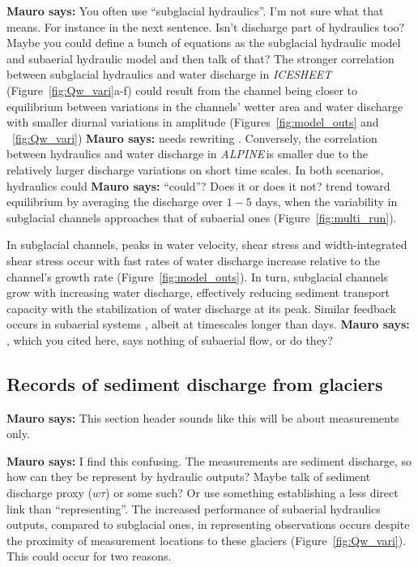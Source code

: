 \documentclass[draft]{agujournal2019}
\newcommand{\mauro}[1]{{\textbf{\color{green}Mauro says:} \color{green} #1} }
\newcommand{\alpine}{\textit{ALPINE}\,}
\newcommand{\icesheet}{\textit{ICESHEET}\,}
\begin{document}
\mauro{You often use ``subglacial hydraulics''.  I'm not sure what that means. For instance in the next sentence.  Isn't discharge part of hydraulics too?  Maybe you could define a bunch of equations as the subglacial hydraulic model and subaerial hydraulic model and then talk of that?}
%
The stronger correlation between subglacial hydraulics and water discharge in \icesheet{} (Figure~\ref{fig:Qw_vari}a-f) could result from the channel being closer to equilibrium between variations in the channels' wetter area and water discharge with smaller diurnal variations in amplitude (Figures~\ref{fig:model_outs} and ~\ref{fig:Qw_vari}) \mauro{needs rewriting}.
Conversely, the correlation between hydraulics and water discharge in \alpine is smaller due to the relatively larger discharge variations on short time scales.
In both scenarios, hydraulics could \mauro{``could''?  Does it or does it not?} trend toward equilibrium by averaging the discharge over $1-5$ days, when the variability in subglacial channels approaches that of subaerial ones (Figure~\ref{fig:multi_run}).

In subglacial channels, peaks in water velocity, shear stress and width-integrated shear stress occur with  fast rates of water discharge increase relative to the channel's growth rate (Figure~\ref{fig:model_outs}).
In turn, subglacial channels grow with increasing water discharge, effectively reducing sediment transport capacity with the stabilization of water discharge at its peak.
Similar feedback occurs in subaerial systems \cite{phillips2016}, albeit at timescales longer than days.  \mauro{, which you cited here, says nothing of subaerial flow, or do they?}

\subsection{Records of sediment discharge  from glaciers}
\mauro{This section header sounds like this will be about measurements only.}

\mauro{I find this confusing.  The measurements are sediment discharge, so how can they be represent by hydraulic outputs?  Maybe talk of sediment discharge proxy ($w\tau$) or some such?  Or use something establishing a less direct link than ``representing''.}
The increased performance of subaerial hydraulics outputs, compared to subglacial ones, in representing observations occurs despite the proximity of measurement locations to these glaciers (Figure~\ref{fig:Qw_vari}).
This could occur for two reasons.
\end{document}
